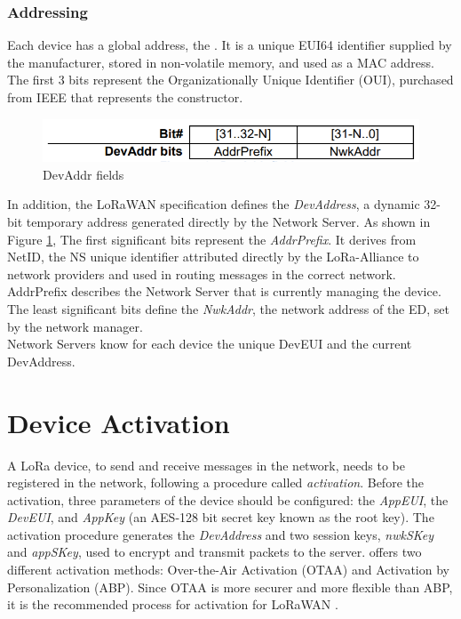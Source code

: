 \subsubsection{Addressing}
Each device has a global address, the \textit{\de}. It is a unique EUI64 identifier supplied by the manufacturer, stored in non-volatile memory, and used as a MAC address. The first 3 bits represent the Organizationally Unique Identifier (OUI), purchased from IEEE that represents the constructor.
\begin{figure}[H]
    \centering
    \includegraphics[width=0.7\linewidth]{images/lorawan/devaddr.PNG}
    \caption{DevAddr fields}
    \label{fig:devaddr}
\end{figure}
In addition, the LoRaWAN specification defines the \textit{DevAddress}, a dynamic 32-bit temporary address generated directly by the Network Server. As shown in Figure \ref{fig:devaddr}, The first significant bits represent the \textit{AddrPrefix}. It derives from NetID, the NS unique identifier attributed directly by the LoRa-Alliance to network providers and used in routing messages in the correct network. AddrPrefix describes the Network Server that is currently managing the device. The least significant bits define the \textit{NwkAddr}, the network address of the ED, set by the network manager.
\\
Network Servers know for each device the unique DevEUI and the current DevAddress.

\section{Device Activation}
A LoRa device, to send and receive messages in the network, needs to be registered in the network, following a procedure called \textit{activation}. Before the activation, three parameters of the device should be configured: the \textit{AppEUI}, the \textit{DevEUI}, and \textit{AppKey} (an AES-128 bit secret key known as the root key). The activation procedure generates the \textit{DevAddress} and two session keys, \textit{nwkSKey} and \textit{appSKey}, used to encrypt and transmit packets to the server. \lorawan offers two different activation methods: Over-the-Air Activation (OTAA) and Activation by Personalization (ABP). Since OTAA is more securer and more flexible than ABP, it is the recommended process for activation for LoRaWAN \cite{the_things_network}.

